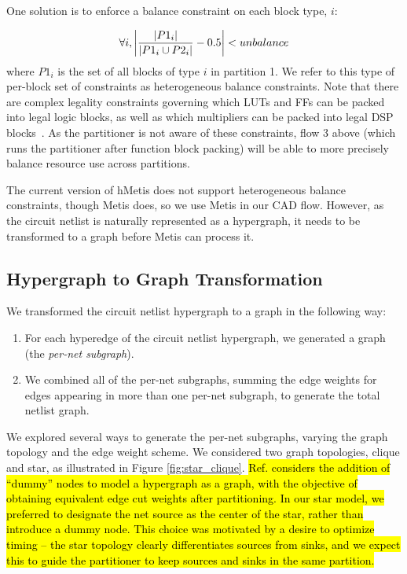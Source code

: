 One solution is to enforce a balance constraint on each block type, $i$:

\begin{equation}
\forall i, \abs*{ \frac{| P1_i |}{|P1_i \cup P2_i |} - 0.5} < unbalance
\end{equation}
where $P1_i$ is the set of all blocks of type $i$ in partition 1. We refer to this type of per-block set of constraints as heterogeneous balance constraints. Note that there are complex legality constraints governing which LUTs and FFs can be packed into legal logic blocks, as well as which multipliers can be packed into legal DSP blocks~\cite{luu2014vtr}. As the partitioner is not aware of these constraints, flow 3 above (which runs the partitioner after function block packing) will be able to more precisely balance resource use across partitions.

The current version of hMetis does not support heterogeneous balance constraints, though Metis does, so we use Metis in our CAD flow. However, as the circuit netlist is naturally represented as a hypergraph, it needs to be transformed to a graph before Metis can process it.

\subsection{Hypergraph to Graph Transformation}\label{sec:hypergraph_to_graph}
We transformed the circuit netlist hypergraph to a graph in the following way:
\begin{enumerate}[label=(\roman*)]
\item For each hyperedge of the circuit netlist hypergraph, we generated a graph (the \emph{per-net subgraph}).
\item We combined all of the per-net subgraphs, summing the edge weights for edges appearing in more than one per-net subgraph, to generate the total netlist graph.
\end{enumerate}

We explored several ways to generate the per-net subgraphs, varying the graph topology and the edge weight scheme. We considered two graph topologies, clique and star, as illustrated in Figure \ref{fig:star_clique}. \hl{Ref.\mbox{\cite{hypergraph_to_graph_survey}}
considers the addition of ``dummy'' nodes to model a hypergraph as a graph, with the objective of obtaining equivalent edge cut weights after partitioning. In our star model, we preferred to designate the net source as the center of the star, rather than introduce a dummy node. This choice was motivated by a desire to optimize timing -- the star topology clearly differentiates sources from sinks, and we expect this to guide the partitioner to keep sources and sinks in the same partition.}

